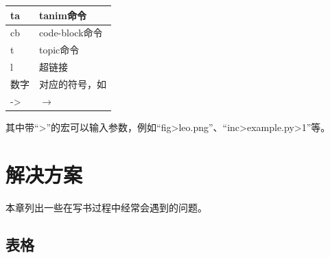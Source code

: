 \documentclass[letterpaper,10pt]{sphinxmanual}
\begin{document}
\begin{threeparttable}
\begin{tabulary}{\linewidth}{|L|L|}
ta
 & 
tanim命令
\\\hline

cb
 & 
code-block命令
\\\hline

t
 & 
topic命令
\\\hline

l
 & 
超链接
\\\hline

数字
 & 
对应的符号，如{\Large{}}\hspace{1mm}
\\\hline

-\textgreater{}
 & 
\(\rightarrow\)
\\\hline
\end{tabulary}

\end{threeparttable}


其中带“\textgreater{}”的宏可以输入参数，例如“fig\textgreater{}leo.png”、“inc\textgreater{}example.py\textgreater{}1”等。


\chapter{解决方案}
\label{tips::doc}\label{tips:id1}
本章列出一些在写书过程中经常会遇到的问题。


\section{表格}
\label{tips:id2}
\end{document}
